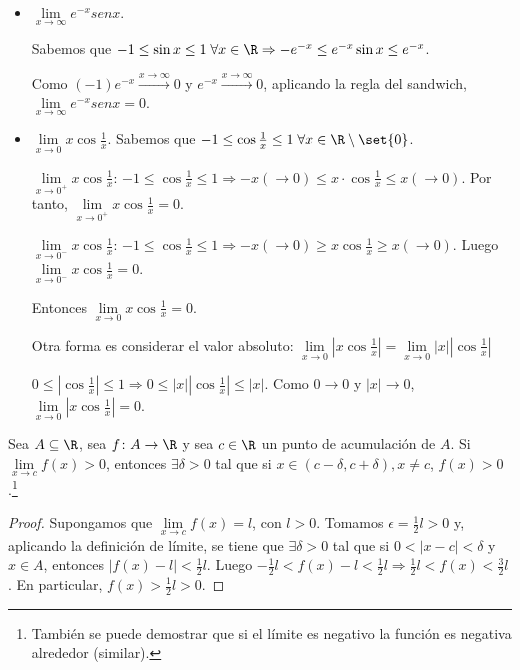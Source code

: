 \begin{example}
	\begin{itemize}
		\item \(\lim\limits_{x  \to \infty} e^{-x}senx  \).

		      Sabemos que \(-1 \leq \sin x \leq 1 \; \forall x \in \R \Rightarrow - e^{-x} \leq e^{-x} \sin x \leq e^{-x}   \).

		      Como \((-1)e^{-x} \overset{x\to \infty}{\longrightarrow } 0 \) y  \(e^{-x} \overset{x\to \infty}{\longrightarrow } 0 \), aplicando la regla del sandwich, \(\lim\limits_{x  \to \infty} e^{-x}senx  = 0\).

		\item \(\lim\limits_{x  \to 0} x \cos \frac{1}{x }\). Sabemos que \(-1 \leq \cos \frac{1}{x} \leq  1 \;\forall x \in \R \setminus \set{0 }\).

		      \(\lim\limits_{x  \to 0^{+}  } x \cos \frac{1}{x}\): \(-1 \leq \cos \frac{1}{x} \leq  1 \Rightarrow -x (\rightarrow 0)\leq x \cdot \cos \frac{1}{x} \leq x (\rightarrow 0)\). Por tanto, \(\lim\limits_{x \to 0^{+} } x \cos \frac{1}{x} = 0 \).

		      \(\lim\limits_{x \to 0^{-} } x \cos  \frac{1}{x} \): \(-1 \leq \cos \frac{1}{x} \leq 1 \Rightarrow -x (\rightarrow 0)\geq x\cos  \frac{1}{x} \geq x (\rightarrow 0)\). Luego \(\lim\limits_{x  \to 0^{-} } x \cos \frac{1}{x} = 0 \).

		      Entonces \(\lim\limits_{x  \to 0 } x \cos \frac{1}{x} = 0 . \)

		      Otra forma es considerar el valor absoluto: \(\lim\limits_{x  \to 0 } \left\vert x \cos \frac{1}{x } \right\vert = \lim\limits_{x  \to 0 } \left\vert x 	\right\vert \left\vert \cos  \frac{1}{x } \right\vert \)

		      \(0 \leq \left\vert \cos \frac{1}{x } \right\vert \leq 1 \Rightarrow 0 \leq \left\vert x  \right\vert \left\vert \cos  \frac{1}{x } \right\vert \leq \left\vert x  \right\vert \). Como \(0 \rightarrow 0 \) y \(\left\vert x  \right\vert \rightarrow 0 \), \(\lim\limits_{x  \to 0 } \left\vert x \cos  \frac{1}{x } \right\vert= 0 \).
	\end{itemize}
\end{example}
\begin{proposition}
	\label{limitepositivo}
	Sea \(A \subseteq \R \), sea \(f \colon A \to \R\) y sea \(c \in \R \) un punto de acumulación de \(A \). Si
	\(
	\lim\limits_{x  \to c } f(x) > 0
	\),
	entonces \(\exists \delta > 0 \) tal que si \(x \in (c - \delta, c + \delta), x \neq c \), \(f(x) > 0\).\footnote{También se puede demostrar que si el límite es negativo la función es negativa alrededor (similar).}
\end{proposition}
\begin{proof}
	Supongamos que \(\lim\limits_{x  \to c } f(x) = l \), con \(l >0 \). Tomamos \(\epsilon = \frac{1}{2} l > 0 \) y, aplicando la definición de límite, se tiene que \(\exists \delta > 0 \) tal que si \(0 < \left\vert x - c  \right\vert < \delta\) y \(x \in A \), entonces \(\left\vert f(x) - l  \right\vert < \frac{1}{2} l\). Luego \(-\frac{1}{2}l < f(x) - l < \frac{1}{2} l \Rightarrow \frac{1}{2} l < f(x) < \frac{3}{2} l\). En particular, \(f(x) > \frac{1}{2} l > 0\).
\end{proof}
